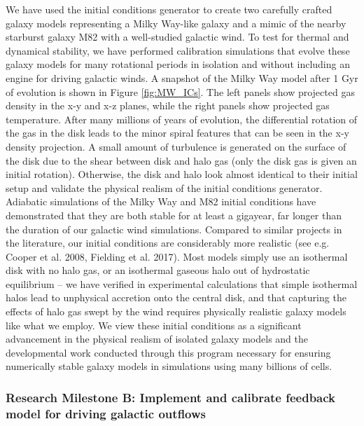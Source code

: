 \documentclass[11pt,letterpaper,english]{article}
\begin{document}
We have used the initial conditions generator to create two carefully crafted galaxy models representing
a Milky Way-like galaxy and a mimic of the nearby starburst galaxy M82 with a well-studied galactic wind.
To test for thermal and dynamical stability, we have performed calibration simulations that
evolve these galaxy models for many rotational periods in isolation and without including
an engine for driving galactic winds. 
A snapshot of the Milky Way model after 1 Gyr of evolution is shown in Figure \ref{fig:MW_ICs}. The left panels show projected gas density in the x-y and x-z planes, while the right panels show projected gas temperature. After many millions of years of evolution, the differential rotation of the gas in the disk leads to the minor spiral features that can be seen in the x-y density projection. A small amount of turbulence is generated on the surface of the disk due to the shear between disk and halo gas (only the disk gas is given an initial rotation). Otherwise, the disk and halo look almost identical to their initial setup and validate the physical realism of the initial conditions generator.
Adiabatic simulations of the Milky Way and M82 initial conditions have demonstrated that they are both stable for at least a gigayear, far longer than the duration of our galactic wind simulations. Compared to similar projects in the literature, our initial conditions are considerably more realistic (see e.g. Cooper et al. 2008, Fielding et al. 2017). Most models simply use an isothermal disk with no halo gas, or an isothermal gaseous 
halo out of hydrostatic equilibrium -- we have verified in experimental calculations that
simple isothermal halos lead to unphysical accretion onto the central disk, and that capturing the effects
of halo gas swept by the wind requires physically realistic galaxy models like what we employ. We view these
initial conditions as a significant advancement in the physical realism of isolated galaxy models and the
developmental work conducted through this program necessary for ensuring numerically stable galaxy
models in simulations using many billions of cells.

\subsubsection{Research Milestone B: Implement and calibrate feedback model for driving galactic outflows}
\end{document}
